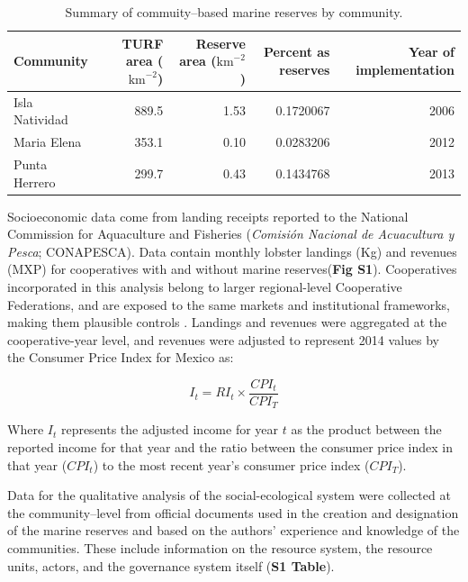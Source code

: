 \documentclass{frontiersSCNS}
\theoremstyle{definition}
\theoremstyle{definition}
\theoremstyle{definition}
\theoremstyle{remark}
\begin{document}
\clearpage

\begin{table}[H]

\caption{\label{tab:unnamed-chunk-2}\label{table:com_sum} Summary of commuity--based marine reserves by community.}
\centering
\begin{tabular}[t]{l|r|r|r|r}
\hline
Community & TURF area ($\mathrm{km}^{-2}$) & Reserve area ($\mathrm{km}^{-2}$) & Percent as reserves & Year of implementation\\
\hline
Isla Natividad & 889.5 & 1.53 & 0.1720067 & 2006\\
\hline
Maria Elena & 353.1 & 0.10 & 0.0283206 & 2012\\
\hline
Punta Herrero & 299.7 & 0.43 & 0.1434768 & 2013\\
\hline
\end{tabular}
\end{table}

Socioeconomic data come from landing receipts reported to the National
Commission for Aquaculture and Fisheries (\emph{Comisión Nacional de
Acuacultura y Pesca}; CONAPESCA). Data contain monthly lobster landings
(Kg) and revenues (MXP) for cooperatives with and without marine
reserves(\textbf{Fig S1}). Cooperatives incorporated in this analysis
belong to larger regional-level Cooperative Federations, and are exposed
to the same markets and institutional frameworks, making them plausible
controls \citep{mccay_2017-1m,ayer_2018}. Landings and revenues were
aggregated at the cooperative-year level, and revenues were adjusted to
represent 2014 values by the Consumer Price Index for Mexico
\citep{oecd_2017-VV} as:

\begin{equation}
I_t = RI_t\times\frac{CPI_t}{CPI_T}
\label{eqn:cpi}
\end{equation}

Where \(I_t\) represents the adjusted income for year \(t\) as the
product between the reported income for that year and the ratio between
the consumer price index in that year (\(CPI_t\)) to the most recent
year's consumer price index (\(CPI_T\)).

Data for the qualitative analysis of the social-ecological system were
collected at the community--level from official documents used in the
creation and designation of the marine reserves
\citep{dof_website_2012,dof_website_2013,dof_website_2018} and based on
the authors' experience and knowledge of the communities. These include
information on the resource system, the resource units, actors, and the
governance system itself (\textbf{S1 Table}).
\end{document}
